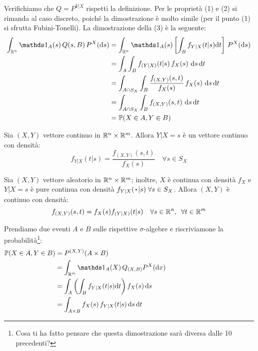 Verifichiamo che $Q = P^{Y|X}$ rispetti la definizione.
Per le proprietà (1) e (2) si rimanda al caso discreto, poiché la dimostrazione è molto simile (per il punto (1) si sfrutta Fubini-Tonelli). La dimostrazione della (3) è la seguente:
\begin{align*}
  \int_{\RR^n} \Ind_A(s) \, Q(s, B) \, P^X(\de s)
  &= \int_{\RR^n} \Ind_A(s) \left[ \int_B f_{Y|X}(t|s) \de t \right] \, P^X(\de s) \\
  &= \int_A \int_B f_{(Y|X)}(t|s) \, f_X(s) \ \de s \, \de t \\
  &= \int_{A \cap S_X} \int_B \dfrac {f_{(X, Y)}(s,t)} {f_X(s)} \, f_X(s) \ \de s \, \de t \\
  &= \int_{A \cap S_X} \int_B f_{(X, Y)}(s,t) \ \de s \, \de t \\
  &= \PP(X \in A, Y \in B)
\end{align*}

\begin{prop}
  Sia $(X,Y)$ vettore continuo in $\mathbb R^n \times \mathbb R^m$.
  Allora $Y|X=s$ è un vettore continuo con densità:
  $$f_{Y|X}(t | s) = \frac{f_{(X,Y)}(s,t)}{f_X (s)} \quad \forall s \in S_X$$
  \end{prop}

\begin{prop}
  Sia $(X,Y)$ vettore aleatorio in $\mathbb R^n \times \mathbb R^m$; inoltre, $X$ è continua con densità $f_X$ e $Y|X = s$ è pure continua con densità $f_{Y|X}(\, \bigcdot \, | s) \; \forall s \in S_X$.
  Allora $(X,Y)$ è continuo con densità:
  $$f_{(X,Y)} (s,t) = f_X(s) f_{(Y|X)}(t|s) \quad \forall s \in \mathbb R^n, \enspace \forall t \in \mathbb R^m$$
\end{prop}

\begin{dimo}\belowdisplayskip=-21pt
  Prendiamo due eventi $A$ e $B$ sulle rispettive $\sigma$-algebre e riscriviamone la probabilità\footnote{Cosa ti ha fatto pensare che questa dimostrazione sarà diversa dalle 10 precedenti?}:
  \begin{align*}
    \PP(X \in A, Y \in B) &= P^{(X,Y)} (A \times B) \\
    &= \int_{\RR^m} \Ind_A(X) \, Q_{(X,B)} P^X(\dx) \\
    &= \int_{A} \left( \int_{B} f_{Y|X} (t|s) \de t \right) f_X(s) \, \de s \\
    &= \int_{A \times B} f_X(s) \, f_{Y|X} (t|s) \, \de s\,  \de t &\hspace{12em}
  \end{align*}\qedhere
\end{dimo}

